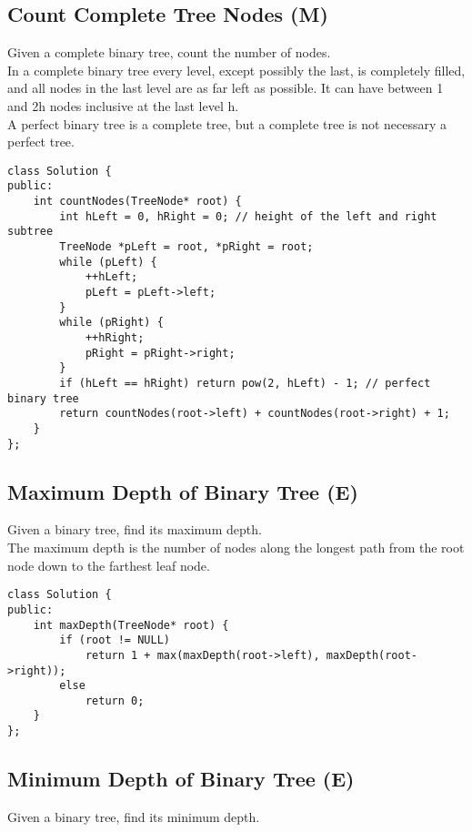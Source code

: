 \subsection{Count Complete Tree Nodes (M)}
Given a complete binary tree, count the number of nodes.\\

In a complete binary tree every level, except possibly the last, is completely filled, and all nodes in the last level are as far left as possible. It can have between 1 and 2h nodes inclusive at the last level h.\\

A perfect binary tree is a complete tree, but a complete tree is not necessary a perfect tree.\\

\begin{lstlisting}
class Solution {
public:
    int countNodes(TreeNode* root) {
        int hLeft = 0, hRight = 0; // height of the left and right subtree
        TreeNode *pLeft = root, *pRight = root;
        while (pLeft) {
            ++hLeft;
            pLeft = pLeft->left;
        }
        while (pRight) {
            ++hRight;
            pRight = pRight->right;
        }
        if (hLeft == hRight) return pow(2, hLeft) - 1; // perfect binary tree
        return countNodes(root->left) + countNodes(root->right) + 1;
    }
};
\end{lstlisting}


\subsection{Maximum Depth of Binary Tree (E)}
Given a binary tree, find its maximum depth.\\

The maximum depth is the number of nodes along the longest path from the root node down to the farthest leaf node.\\

\begin{lstlisting}
class Solution {
public:
    int maxDepth(TreeNode* root) {
        if (root != NULL)
            return 1 + max(maxDepth(root->left), maxDepth(root->right));
        else
            return 0;
    }
};
\end{lstlisting}


\subsection{Minimum Depth of Binary Tree (E)}
Given a binary tree, find its minimum depth.\\

